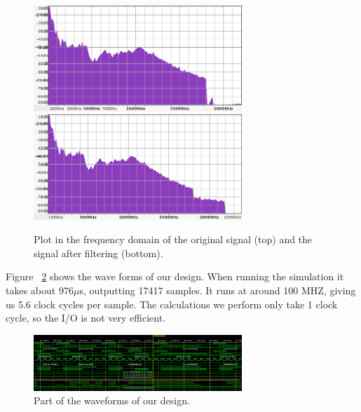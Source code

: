 \begin{figure}
\begin{center}
\includegraphics[width=0.7\textwidth]{images/music-input-spectrum.png}
\includegraphics[width=0.7\textwidth]{images/music-output-spectrum.png}
\caption{Plot in the frequency domain of the original signal (top) and the signal after filtering (bottom).}
\label{fig:spectrum}
\end{center}
\end{figure}

Figure ~\ref{fig:wave} shows the wave forms of our design. When running the simulation it takes about 976$\mu$s, outputting 17417 samples. It runs at around 100 MHZ, giving us 5.6 clock cycles per sample. The calculations we perform only take 1 clock cycle, so the I/O is not very efficient.
\begin{figure}
\begin{center}
\includegraphics[width=0.7\textwidth]{images/waveforms.png}
\caption{Part of the waveforms of our design.}
\label{fig:wave}
\end{center}
\end{figure}

\FloatBarrier



